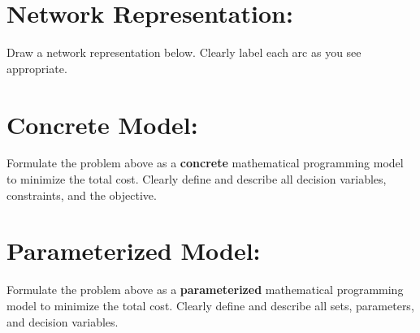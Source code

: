 \documentclass[11pt]{article}
\theoremstyle{definition}
\begin{document}
\section{Network Representation:}

Draw a network representation below. Clearly label each arc as you see appropriate.
\newpage
\section{Concrete Model:}

Formulate the problem above as a \textbf{concrete} mathematical programming model to minimize the total cost. Clearly define and describe all decision variables, constraints, and the objective.

\newpage

\section{Parameterized Model:}

Formulate the problem above as a \textbf{parameterized} mathematical programming model to minimize the total cost. Clearly define and describe all sets, parameters, and decision variables.

		
\end{document}
